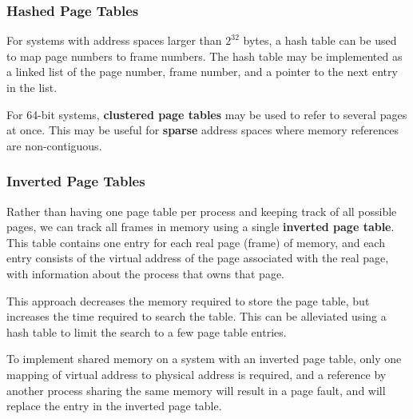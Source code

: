 \documentclass{article}
\begin{document}
\subsubsection{Hashed Page Tables}
For systems with address spaces larger than \(2^{32}\) bytes, a hash
table can be used to map page numbers to frame numbers. The hash table
may be implemented as a linked list of the page number, frame number,
and a pointer to the next entry in the list.

For 64-bit systems, \textbf{clustered page tables} may be used to refer
to several pages at once. This may be useful for \textbf{sparse}
address spaces where memory references are non-contiguous.
\subsubsection{Inverted Page Tables}
Rather than having one page table per process and keeping track of all
possible pages, we can track all frames in memory using a single
\textbf{inverted page table}. This table contains one entry for each
real page (frame) of memory, and each entry consists of the virtual
address of the page associated with the real page, with information
about the process that owns that page.

This approach decreases the memory required to store the page table,
but increases the time required to search the table. This can be alleviated
using a hash table to limit the search to a few page table entries.

To implement shared memory on a system with an inverted page table, only
one mapping of virtual address to physical address is required, and
a reference by another process sharing the same memory will result in a
page fault, and will replace the entry in the inverted page table.
\end{document}
